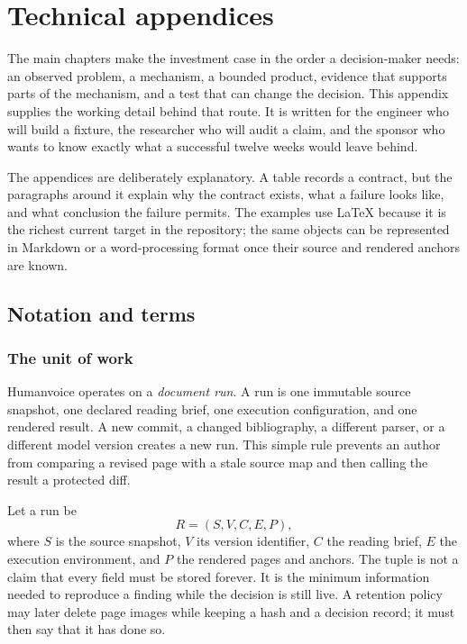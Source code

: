 \chapter{Technical appendices}
\label{ch:expanded-appendices}

The main chapters make the investment case in the order a decision-maker
needs: an observed problem, a mechanism, a bounded product, evidence that
supports parts of the mechanism, and a test that can change the decision.
This appendix supplies the working detail behind that route. It is written
for the engineer who will build a fixture, the researcher who will audit a
claim, and the sponsor who wants to know exactly what a successful twelve
weeks would leave behind.

The appendices are deliberately explanatory. A table records a contract, but
the paragraphs around it explain why the contract exists, what a failure looks
like, and what conclusion the failure permits. The examples use LaTeX because
it is the richest current target in the repository; the same objects can be
represented in Markdown or a word-processing format once their source and
rendered anchors are known.

\section{Notation and terms}
\label{app:notation}

\subsection{The unit of work}

Humanvoice operates on a \emph{document run}. A run is one immutable source
snapshot, one declared reading brief, one execution configuration, and one
rendered result. A new commit, a changed bibliography, a different parser, or
a different model version creates a new run. This simple rule prevents an
author from comparing a revised page with a stale source map and then calling
the result a protected diff.

Let a run be
\[
  R=(S,V,C,E,P),
\]
where $S$ is the source snapshot, $V$ its version identifier, $C$ the reading
brief, $E$ the execution environment, and $P$ the rendered pages and
anchors. The tuple is not a claim that every field must be stored forever. It
is the minimum information needed to reproduce a finding while the decision
is still live. A retention policy may later delete page images while keeping a
hash and a decision record; it must then say that it has done so.


